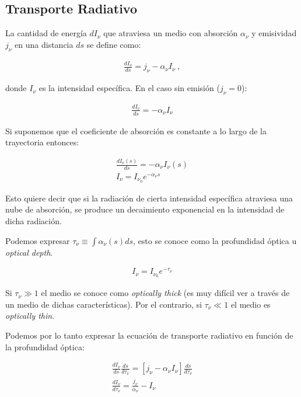 \documentclass{tufte-handout}
\begin{document}
\subsection{Transporte Radiativo}

La cantidad de energía $dI_\nu$ que atraviesa un medio con absorción $\alpha_\nu$ y emisividad $j_\nu$ en una distancia $ds$ se define como:

\begin{align}
\frac{dI_\nu}{ds} = j_\nu - \alpha_\nu I_\nu~,
\end{align}

donde $I_\nu$ es la intensidad específica. En el caso sin emisión ($j_\nu = 0$):

\begin{align}
  \frac{dI_\nu}{ds} = - \alpha_\nu I_\nu
\end{align}

Si suponemos que el coeficiente de absorción es constante a lo largo de la trayectoria entonces:

\begin{align}
  \frac{dI_\nu(s)}{ds} = - \alpha_\nu I_\nu(s)\\
  I_\nu = I_{\nu_0} e^{- \alpha_\nu s}
\end{align}

Esto quiere decir que si la radiación de cierta intensidad específica atraviesa una nube de absorción, se produce un decaimiento exponencial en la intensidad de dicha radiación.

Podemos expresar $\tau_\nu \equiv \int \alpha_\nu(s) ds$, esto se conoce como la profundidad óptica u \emph{optical depth}.

\begin{align}
  I_\nu = I_{\nu_0} e^{-\tau_\nu}
\end{align}

Si $\tau_\nu \gg 1$ el medio se conoce como \emph{optically thick} (es muy difícil ver a través de un medio de dichas características). Por el contrario, si $\tau_\nu \ll 1$ el medio es \emph{optically thin}.

Podemos por lo tanto expresar la ecuación de transporte radiativo en función de la profundidad óptica:

\begin{align}
  \frac{dI_\nu}{ds}\frac{ds}{d\tau_\nu} = [j_\nu - \alpha_\nu I_\nu]\frac{ds}{d\tau_\nu}\\
  \frac{dI_\nu}{d\tau_\nu} = \frac{j_\nu}{\alpha_\nu} - I_\nu
\end{align}
\end{document}
